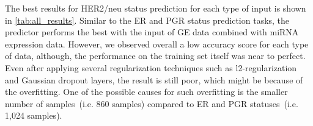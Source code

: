 \hspace*{3.5mm} The best results for HER2/neu status prediction for each type of input is shown in \cref{tab:all_results}. Similar to the ER and PGR status prediction tasks, the predictor performs the best with the input of GE data combined with miRNA expression data.  However, we observed overall a low accuracy score for each type of data, although, the performance on the training set itself was near to perfect. Even after applying several regularization techniques such as l2-regularization and Gaussian dropout layers, the result is still poor, which might be because of the overfitting. One of the possible causes for such overfitting is the smaller number of samples~(i.e. 860 samples) compared to ER and PGR statuses~(i.e. 1,024 samples).


